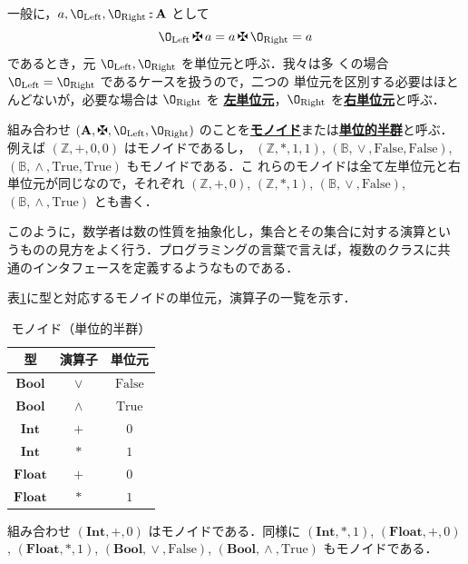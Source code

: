 \documentclass[a5paper,twoside,fleqn,draft]{jsbook}
\newcommand{\keyword}[1]{{\underline{\textbf{#1}}}}
\newcommand{\mSpecialConstant}[1]{\textrm{#1}} %
\newcommand{\mFalse}{\mSpecialConstant{False}}
\newcommand{\mTrue}{\mSpecialConstant{True}}
\newcommand{\mZero}{\O}
\DeclareMathOperator{\mIn}{{:\!:}}
\DeclareMathOperator{\mLogicalAnd}{\wedge}
\DeclareMathOperator{\mLogicalOr}{\vee}
\DeclareMathOperator{\mPlus}{\maltese}
\newcommand{\mSpecialSub}[1]{\text{#1}}
\newcommand{\mLeft}{\mSpecialSub{Left}}
\newcommand{\mRight}{\mSpecialSub{Right}}
\newcommand{\mSet}[1]{\mathbf{#1}}
\newcommand{\mSpecialSet}[1]{\mathbb{#1}} %
\newcommand{\mBSet}{\mSpecialSet{B}}
\newcommand{\mZSet}{\mSpecialSet{Z}}
\newcommand{\mType}[1]{\mathbf{#1}}
\newcommand{\mBoolType}{\mType{Bool}}
\newcommand{\mFloatType}{\mType{Float}}
\newcommand{\mIntType}{\mType{Int}}
\newcommand{\mTupleWith}[1]{\left(#1\right)}
\begin{document}
一般に，$a,\mZero_\mLeft,\mZero_\mRight\mIn\mSet{A}$ として
\begin{equation}
  \label{eq:identity}
  \mZero_\mLeft\mPlus a=a\mPlus\mZero_\mRight=a
\end{equation}
であるとき，元 $\mZero_\mLeft,\mZero_\mRight$ を単位元と呼ぶ．我々は多
くの場合 $\mZero_\mLeft=\mZero_\mRight$ であるケースを扱うので，二つの
単位元を区別する必要はほとんどないが，必要な場合は $\mZero_\mRight$ を
\keyword{左単位元}，$\mZero_\mRight$ を\keyword{右単位元}と呼ぶ．

組み合わせ $\mTupleWith{\mSet{A},\mPlus,\mZero_\mLeft,\mZero_\mRight}$
のことを\keyword{モノイド}または\keyword{単位的半群}と呼ぶ．例えば
$\mTupleWith{\mZSet,+,0,0}$ はモノイドであるし，
$\mTupleWith{\mZSet,*,1,1}$,
$\mTupleWith{\mBSet,\mLogicalOr,\mFalse,\mFalse}$,
$\mTupleWith{\mBSet,\mLogicalAnd,\mTrue,\mTrue}$ もモノイドである．こ
れらのモノイドは全て左単位元と右単位元が同じなので，それぞれ
$\mTupleWith{\mZSet,+,0}$, $\mTupleWith{\mZSet,*,1}$,
$\mTupleWith{\mBSet,\mLogicalOr,\mFalse}$,
$\mTupleWith{\mBSet,\mLogicalAnd,\mTrue}$ とも書く．

このように，数学者は数の性質を抽象化し，集合とその集合に対する演算とい
うものの見方をよく行う．プログラミングの言葉で言えば，複数のクラスに共
通のインタフェースを定義するようなものである．

表\ref{tab:monoids}に型と対応するモノイドの単位元，演算子の一覧を示す．

\begin{table}
\caption{モノイド（単位的半群）}
\label{tab:monoids}
\begin{center}
\begin{tabular}{||c||c|c||}
\hline 型&演算子&単位元\\ \hline\hline $\mBoolType$ &$\vee$
&$\mFalse$\\ \hline $\mBoolType$ &$\wedge$ &$\mTrue$\\ \hline
$\mIntType$ &$+$ &$0$\\ \hline $\mIntType$ &$*$ &$1$\\ \hline
$\mFloatType$ &$+$ &$0$\\ \hline $\mFloatType$ &$*$ &$1$\\ \hline
\end{tabular}
\end{center}
\end{table}

組み合わせ $(\mIntType,+,0)$ はモノイドである．同様に
$(\mIntType,*,1)$, $(\mFloatType,+,0)$, $(\mFloatType,*,1)$,
$(\mBoolType,\mLogicalOr,\mFalse)$, $(\mBoolType,\mLogicalAnd,\mTrue)$
もモノイドである．
\end{document}
